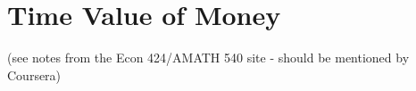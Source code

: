 \documentclass{scrartcl}
\begin{document}
\tableofcontents
\section {Time Value of Money}
\label{sec:2-1}
(see notes from the Econ 424/AMATH 540 site - should be mentioned by Coursera)
\end{document}
